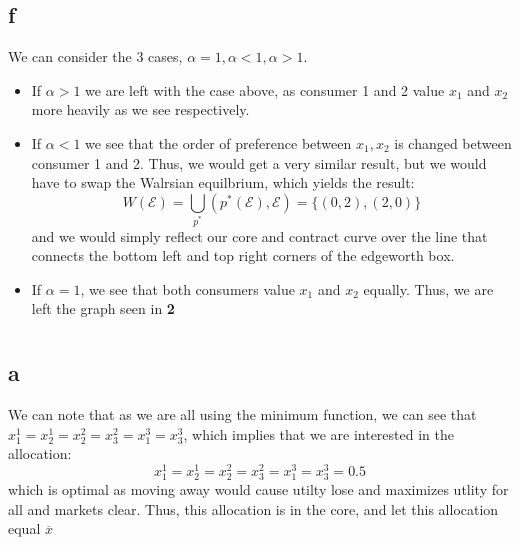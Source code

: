 \documentclass[11pt]{article}
\begin{document}
\subsection*{f}
We can consider the 3 cases, $\alpha = 1, \alpha < 1, \alpha > 1$. 
\begin{itemize}
    \item If $\alpha > 1$ we are left with the case above, as consumer 1 and 2 value $x_1$ and $x_2$ more heavily as we see respectively. 
    \item If $\alpha < 1$ we see that the order of preference between $x_1, x_2$ is changed between consumer 1 and 2. Thus, we would get a very similar result, but we would have to swap the Walrsian equilbrium, which yields the result: 
    \[
        W(\mathcal{E}) = \bigcup_{p^*}(p^*(\mathcal{E}), \mathcal{E}) = \{(0, 2), (2, 0)\} 
    \]
    and we would simply reflect our core and contract curve over the line that connects the bottom left and top right corners of the edgeworth box. 
    \item If $\alpha = 1$, we see that both consumers value $x_1$ and $x_2$ equally. Thus, we are left the graph seen in \textbf{2}
\end{itemize}
\section{}
\subsection*{a}
We can note that as we are all using the minimum function, we can see that $x_1^1 = x_2^1 = x_2^2 = x_3^2 = x_1^3 = x_3^3$, which implies that we are interested in the allocation:
\[
    x_1^1 = x_2^1 = x_2^2 = x_3^2 = x_1^3 = x_3^3 = 0.5
\]
which is optimal as moving away would cause utilty lose and maximizes utlity for all and markets clear. Thus, this allocation is in the core, and let this allocation equal $\overline{x}$
\end{document}
